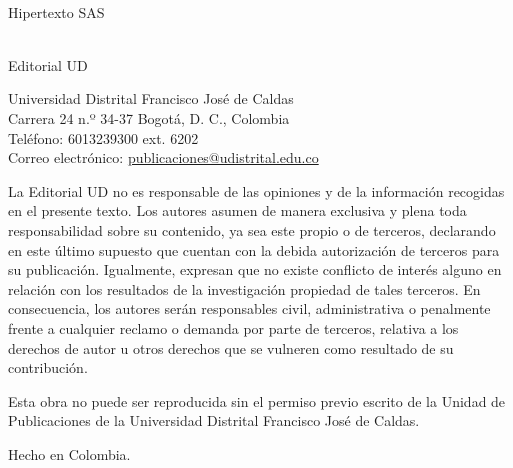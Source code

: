 \begin{minipage}[t]{4.46in}
\begin{minipage}[t]{0.45\textwidth}
\begin{raggedright}
      \\
      \indentar Hipertexto SAS

      \vspace{0.5em}

      \\
      \indentar Editorial UD
    \end{raggedright}
  \end{minipage}\hfill
  \begin{minipage}[t]{0.49\textwidth}
    \begin{raggedright}

      Universidad Distrital Francisco José de Caldas\\
      Carrera 24 n.º 34-37 Bogotá, D. C., Colombia\\
      Teléfono: 6013239300 ext. 6202\\
      Correo electrónico: \href{mailto:publicaciones@udistrital.edu.co}{publicaciones@udistrital.edu.co}

      \vspace{1.2em}

      \begingroup\fontsize{6pt}{7pt}\opseries\selectfont

      La Editorial UD no es responsable de las opiniones y de la
      información recogidas en el presente texto. Los autores
      asumen de manera exclusiva y plena toda responsabilidad
      sobre su contenido, ya sea este propio o de terceros,
      declarando en este último supuesto que cuentan con
      la debida autorización de terceros para su publicación.
      Igualmente, expresan que no existe conflicto de interés
      alguno en relación con los resultados de la investigación
      propiedad de tales terceros. En consecuencia, los autores
      serán responsables civil, administrativa o penalmente frente
      a cualquier reclamo o demanda por parte de terceros,
      relativa a los derechos de autor u otros derechos que se
      vulneren como resultado de su contribución.

      \vspace{1.2em}


      Esta obra no puede ser reproducida sin el permiso previo
      escrito de la Unidad de Publicaciones de la Universidad
      Distrital Francisco José de Caldas.

      Hecho en Colombia.
      \endgroup
    \end{raggedright}
  \end{minipage}


\end{minipage}
